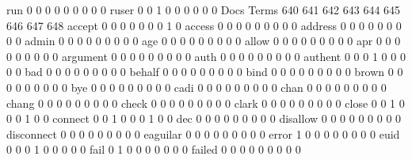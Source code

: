 \documentclass[compress,8pt]{beamer}
\begin{document}
\begin{frame}
\begin{Schunk}
  run                                        0   0   0   0   0   0   0   0   0
  ruser                                      0   0   1   0   0   0   0   0   0
                                          Docs
Terms                                      640 641 642 643 644 645 646 647 648
  accept                                     0   0   0   0   0   0   0   1   0
  access                                     0   0   0   0   0   0   0   0   0
  address                                    0   0   0   0   0   0   0   0   0
  admin                                      0   0   0   0   0   0   0   0   0
  age                                        0   0   0   0   0   0   0   0   0
  allow                                      0   0   0   0   0   0   0   0   0
  apr                                        0   0   0   0   0   0   0   0   0
  argument                                   0   0   0   0   0   0   0   0   0
  auth                                       0   0   0   0   0   0   0   0   0
  authent                                    0   0   0   1   0   0   0   0   0
  bad                                        0   0   0   0   0   0   0   0   0
  behalf                                     0   0   0   0   0   0   0   0   0
  bind                                       0   0   0   0   0   0   0   0   0
  brown                                      0   0   0   0   0   0   0   0   0
  bye                                        0   0   0   0   0   0   0   0   0
  cadi                                       0   0   0   0   0   0   0   0   0
  chan                                       0   0   0   0   0   0   0   0   0
  chang                                      0   0   0   0   0   0   0   0   0
  check                                      0   0   0   0   0   0   0   0   0
  clark                                      0   0   0   0   0   0   0   0   0
  close                                      0   0   1   0   0   0   1   0   0
  connect                                    0   0   1   0   0   0   1   0   0
  dec                                        0   0   0   0   0   0   0   0   0
  disallow                                   0   0   0   0   0   0   0   0   0
  disconnect                                 0   0   0   0   0   0   0   0   0
  eaguilar                                   0   0   0   0   0   0   0   0   0
  error                                      1   0   0   0   0   0   0   0   0
  euid                                       0   0   0   1   0   0   0   0   0
  fail                                       0   1   0   0   0   0   0   0   0
  failed                                     0   0   0   0   0   0   0   0   0

\end{Schunk}
\end{frame}
\end{document}
